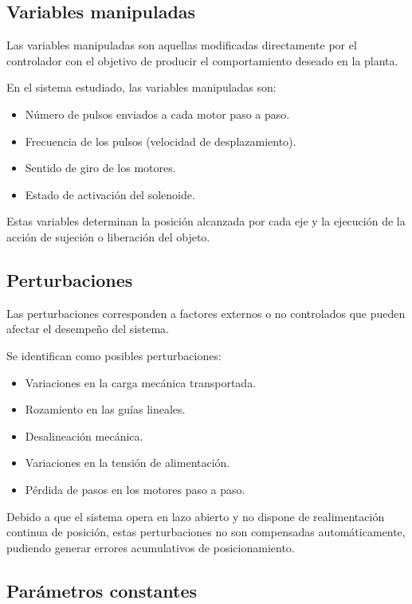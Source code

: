 \documentclass[a4paper,12pt]{article}
\begin{document}
\subsection{Variables manipuladas}

Las variables manipuladas son aquellas modificadas directamente por el controlador con el objetivo de producir el comportamiento deseado en la planta.

En el sistema estudiado, las variables manipuladas son:

\begin{itemize}
    \item Número de pulsos enviados a cada motor paso a paso.
    \item Frecuencia de los pulsos (velocidad de desplazamiento).
    \item Sentido de giro de los motores.
    \item Estado de activación del solenoide.
\end{itemize}

Estas variables determinan la posición alcanzada por cada eje y la ejecución de la acción de sujeción o liberación del objeto.


\subsection{Perturbaciones}

Las perturbaciones corresponden a factores externos o no controlados que pueden afectar el desempeño del sistema.

Se identifican como posibles perturbaciones:

\begin{itemize}
    \item Variaciones en la carga mecánica transportada.
    \item Rozamiento en las guías lineales.
    \item Desalineación mecánica.
    \item Variaciones en la tensión de alimentación.
    \item Pérdida de pasos en los motores paso a paso.
\end{itemize}

Debido a que el sistema opera en lazo abierto y no dispone de realimentación continua de posición, estas perturbaciones no son compensadas automáticamente, pudiendo generar errores acumulativos de posicionamiento.

\subsection{Parámetros constantes}
\end{document}
